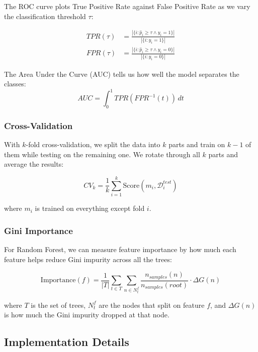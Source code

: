 \documentclass[12pt]{article}
\begin{document}
The ROC curve plots True Positive Rate against False Positive Rate as we vary the classification threshold $\tau$:

\begin{align}
TPR(\tau) &= \frac{|\{i : \hat{p}_i \geq \tau \land y_i = 1\}|}{|\{i : y_i = 1\}|} \\[0.5em]
FPR(\tau) &= \frac{|\{i : \hat{p}_i \geq \tau \land y_i = 0\}|}{|\{i : y_i = 0\}|}
\end{align}

The Area Under the Curve (AUC) tells us how well the model separates the classes:
\begin{equation}
AUC = \int_0^1 TPR(FPR^{-1}(t)) \, dt
\end{equation}

\subsubsection{Cross-Validation}

With $k$-fold cross-validation, we split the data into $k$ parts and train on $k-1$ of them while testing on the remaining one. We rotate through all $k$ parts and average the results:

\begin{equation}
CV_k = \frac{1}{k} \sum_{i=1}^{k} \text{Score}(m_i, \mathcal{D}_i^{test})
\end{equation}

where $m_i$ is trained on everything except fold $i$.

\subsubsection{Gini Importance}

For Random Forest, we can measure feature importance by how much each feature helps reduce Gini impurity across all the trees:

\begin{equation}
\text{Importance}(f) = \frac{1}{|T|} \sum_{t \in T} \sum_{n \in N_t^f} \frac{n_{samples}(n)}{n_{samples}(root)} \cdot \Delta G(n)
\end{equation}

where $T$ is the set of trees, $N_t^f$ are the nodes that split on feature $f$, and $\Delta G(n)$ is how much the Gini impurity dropped at that node.

\subsection{Implementation Details}
\end{document}
